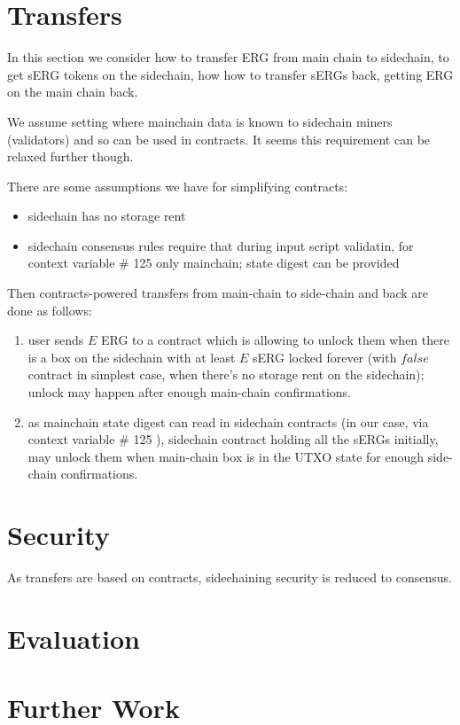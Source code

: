 \documentclass{article}   %
\newcommand{\authnote}[2]{\marginpar{\parbox{\marginparwidth}{\tiny %
  \textsf{#1 {\textcolor{blue}{notes: #2}}}}}%
  \textcolor{blue}{\textbf{\dag}}}
\newcommand{\authnote}[2]{
  \textsf{#1 \textcolor{blue}{: #2}}}
\newcommand{\authnote}[2]{}
\newcommand{\knote}[1]{{\authnote{\textcolor{green}{kushti notes}}{#1}}}
\begin{document}
\section{Transfers}

In this section we consider how to transfer ERG from main chain to sidechain, to get sERG tokens on the sidechain, how
how to transfer sERGs back, getting ERG on the main chain back.

We assume setting where mainchain data is known to sidechain miners (validators) and so can be used in contracts. It seems
this requirement can be relaxed further though.

There are some assumptions we have for simplifying contracts:
\begin{itemize}
  \item sidechain has no storage rent
  \item sidechain consensus rules require that during input script validatin, for context variable \# 125 only mainchain;
        state digest can be provided
\end{itemize}

Then contracts-powered transfers from main-chain to side-chain and back are done as follows:

\begin{enumerate}
  \item user sends $E$ ERG to a contract which is allowing to unlock them when there is a box on the sidechain with
  at least $E$ sERG locked forever (with ${false}$ contract in simplest case, when there's no storage rent on the sidechain);
  unlock may happen after enough main-chain confirmations.

  \item as mainchain state digest can read in sidechain contracts (in our case, via context variable \# 125 ), sidechain
  contract holding all the sERGs initially, may unlock them when main-chain box is in the UTXO state for enough
  side-chain confirmations.
\end{enumerate}

\section{Security}

As transfers are based on contracts, sidechaining security is reduced to consensus.  \knote{to be continued}

\section{Evaluation}

\knote{Fill with tests data}

\section{Further Work}

\newpage

 
\end{document}
